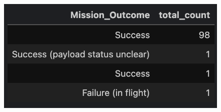 \begin{figure}[htbp]
    \centering
    \captionsetup{justification = raggedright, singlelinecheck = false}
    \label{fig:total_number_of_successful_and_failure_mission_outcomes}
    \includegraphics[scale=0.3125]{figures/total_number_of_successful_and_failure_mission_outcomes}
\end{figure}
